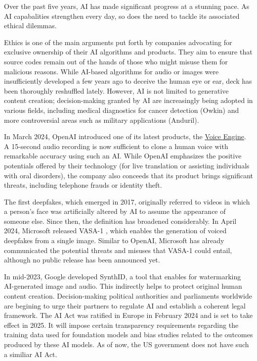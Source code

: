 Over the past five years, \ac{AI} has made significant progress at a stunning pace. As \ac{AI} capabalities strengthen every day, so does the need to tackle its associated ethical dilemmas. 

Ethics is one of the main arguments put forth by companies advocating for exclusive ownership of their \ac{AI} algorithms and products. They aim to ensure that source codes remain out of the hands of those who might misuse them for malicious reasons. While \ac{AI}-based algorithms for audio or images were insufficiently developed a few years ago to deceive the human eye or ear, deck has been thoroughly reshuffled lately. However, \ac{AI} is not limited to generative content creation; decision-making granted by \ac{AI} are increasingly being adopted in various fields, including medical diagnostics for cancer detection (\eg Owkin) and  more controversial areas such as military applications (\eg Anduril).

In March 2024, OpenAI introduced one of its latest products, the \href{https://openai.com/blog/navigating-the-challenges-and-opportunities-of-synthetic-voices}{Voice Engine}. A 15-second audio recording is now sufficient to clone a human voice with remarkable accuracy using such an \ac{AI}. While OpenAI emphasizes the positive potentials offered by their technology (for live translation or assisting individuals with oral disorders), the company also conceeds that its product brings significant threats, including telephone frauds or identity theft. 

The first deepfakes, which emerged in 2017, originally referred to videos in which a person's face was artificially altered by \ac{AI} to assume the appearance of someone else. Since then, the definition has broadened considerably. In April 2024, Microsoft released VASA-1 \citep{xu2024vasa1}, which enables the generation of voiced deepfakes from a single image. Similar to OpenAI, Microsoft has already communicated the potential threats and misuses that VASA-1 could entail, although no public release has been announced yet.

In mid-2023, Google developed SynthID, a tool that enables for watermarking \ac{AI}-generated image and audio. This indirectly helps to protect original human content creation. Decision-making political authorities and parliaments worldwide are begining to urge their partners to regulate \ac{AI} and establish a coherent legal framework. The AI Act was ratified in Europe in February 2024 and is set to take effect in 2025. It will impose certain transparency requirements regarding the training data used for foundation models and bias studies related to the outcomes produced by these \ac{AI} models. As of now, the US government does not have such a similiar AI Act. 


